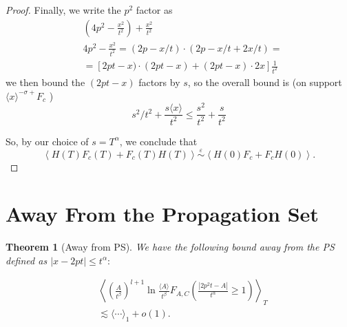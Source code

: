\documentclass[11pt]{article}
\newtheorem{theorem}{Theorem}[section]
\begin{document}
\begin{proof}
Finally, we write the $p^{2}$ factor as
$$
\begin{aligned}
& \left(4 p^{2}-\frac{x^{2}}{t^{2}}\right)+\frac{x^{2}}{t^{2}} \\
& 4 p^{2}-\frac{x^{2}}{t^{2}}=(2 p-x / t) \cdot(2 p-x / t+2 x / t)= \\
& =[2 p t-x) \cdot(2 p t-x)+(2 p t-x) \cdot 2 x] \frac{1}{t^{2}}
\end{aligned}
$$
we then bound the $(2 p t-x)$ factors by $s$, so the overall bound is (on support $\langle x\rangle^{-\sigma+}F_{c}$ )
$$
s^{2} / t^{2}+\frac{s\langle x\rangle}{t^{2}} \leqslant \frac{s^{2}}{t^{2}}+\frac{s}{t^{2}}
$$

So, by our choice of $s=T^{\alpha}$, we conclude that
$$
\left\langle H(T) F_{c}(T)+F_{c}(T) H(T)\right\rangle \stackrel{\varepsilon}{\sim}\left\langle H(0) F_{c}+F_{c} H(0)\right\rangle .
$$

\end{proof}


\section{Away From the Propagation Set}
\begin{theorem}[Away from PS]
We have the following bound away from the PS defined as $|x-2pt|\leq t^{\alpha}:$

\begin{align}
& \left\langle\left(\frac{A}{t^{\beta}}\right)^{l+1} \ln \frac{\langle A\rangle}{t^{\beta}} F_{A, C}\left(\frac{\left|2 p^{2} t-A\right|}{t^{\alpha}} \geqslant 1\right)\right\rangle_{T} \\
& \lesssim\langle\cdots\rangle_{1}+o(1) .
\end{align}
\end{theorem}
\end{document}
